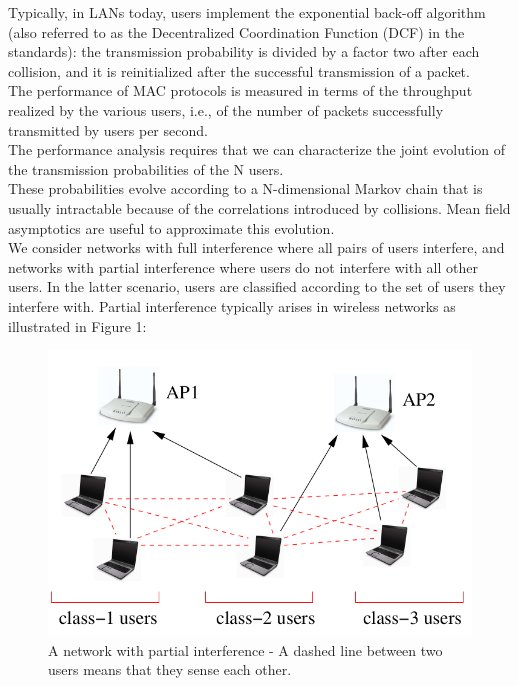 \documentclass[letterpaper,english,10pt]{article}
\begin{document}
Typically, in LANs today, users implement the exponential back-off algorithm (also referred to as the Decentralized Coordination Function (DCF) in the standards): the transmission probability is divided by a factor two after each collision, and it is reinitialized after the successful transmission of a packet.\\

The performance of MAC protocols is measured in terms of the throughput realized by the various users, i.e., of the number of packets successfully transmitted by users per second. \\

The performance analysis requires that we can characterize the joint evolution of the transmission probabilities of the N users.\\

These probabilities evolve according to a N-dimensional Markov chain that is usually intractable because of the correlations introduced by collisions. Mean field asymptotics are useful to approximate this evolution.\\

We consider networks with full interference where all pairs of users interfere, and networks with partial interference where users do not interfere with all other users. In the latter scenario, users are classified according to the set of users they interfere with. Partial interference typically arises in wireless networks as illustrated in Figure 1:
 
\begin{figure}[h!] 
	\includegraphics[width=\linewidth]{L26_Fig_1.png}
	\caption{A network with partial interference - A dashed line between two
users means that they sense each other.}
	\label{fig:1}
\end{figure} 
\end{document}
